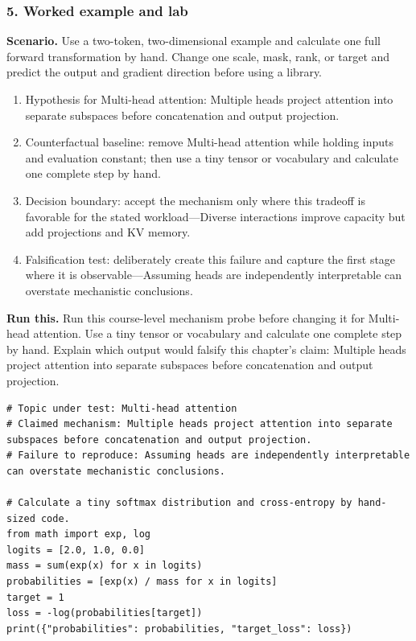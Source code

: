 \subsubsection*{5. Worked example and lab}
\textbf{Scenario.} Use a two-token, two-dimensional example and calculate one full forward transformation by hand. Change one scale, mask, rank, or target and predict the output and gradient direction before using a library.
\begin{enumerate}
\item Hypothesis for Multi-head attention: Multiple heads project attention into separate subspaces before concatenation and output projection.
\item Counterfactual baseline: remove Multi-head attention while holding inputs and evaluation constant; then use a tiny tensor or vocabulary and calculate one complete step by hand.
\item Decision boundary: accept the mechanism only where this tradeoff is favorable for the stated workload—Diverse interactions improve capacity but add projections and KV memory.
\item Falsification test: deliberately create this failure and capture the first stage where it is observable—Assuming heads are independently interpretable can overstate mechanistic conclusions.
\end{enumerate}
\textbf{Run this.} Run this course-level mechanism probe before changing it for Multi-head attention. Use a tiny tensor or vocabulary and calculate one complete step by hand. Explain which output would falsify this chapter's claim: Multiple heads project attention into separate subspaces before concatenation and output projection.
\begin{Verbatim}[fontsize=\scriptsize]
# Topic under test: Multi-head attention
# Claimed mechanism: Multiple heads project attention into separate subspaces before concatenation and output projection.
# Failure to reproduce: Assuming heads are independently interpretable can overstate mechanistic conclusions.

# Calculate a tiny softmax distribution and cross-entropy by hand-sized code.
from math import exp, log
logits = [2.0, 1.0, 0.0]
mass = sum(exp(x) for x in logits)
probabilities = [exp(x) / mass for x in logits]
target = 1
loss = -log(probabilities[target])
print({"probabilities": probabilities, "target_loss": loss})
\end{Verbatim}
